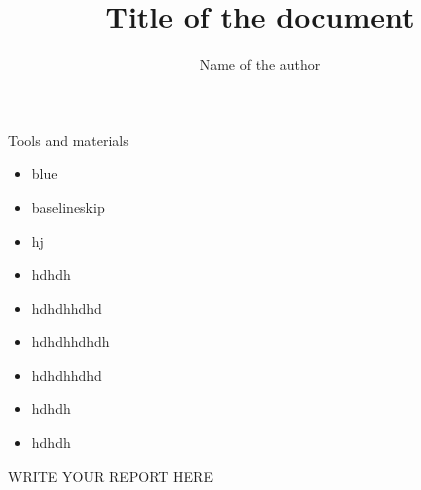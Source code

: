 \documentclass{article}
\begin{document}
	
	\title{Title of the document}
	\author{Name of the author}
	
	\maketitle %

\vfill

    Tools and materials

    \begin{itemize}
        \item blue
        \item baselineskip
        \item hj
        \item hdhdh
        \item hdhdhhdhd
        \item hdhdhhdhdh
        \item hdhdhhdhd
        \item hdhdh
        \item hdhdh
    \end{itemize}
	
	
	
	
	
	
	\newpage















    

WRITE YOUR REPORT HERE
















\end{document}
